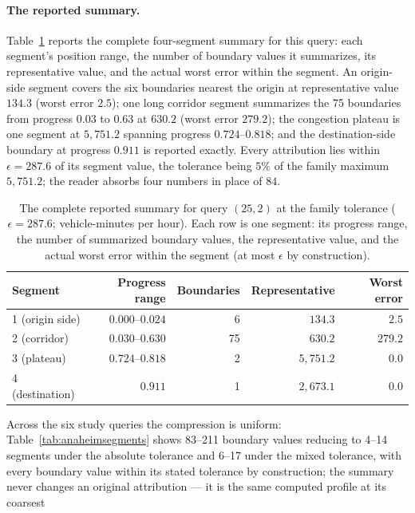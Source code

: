 \paragraph{The reported summary.}
Table~\ref{tab:anaheimsegmentsfull} reports the complete four-segment
summary for this query: each segment's position range, the number of
boundary values it summarizes, its representative value, and the actual
worst error within the segment. An origin-side segment covers the six
boundaries nearest the origin at representative value $134.3$ (worst
error $2.5$); one long corridor segment summarizes the 75 boundaries
from progress $0.03$ to $0.63$ at $630.2$ (worst error $279.2$); the
congestion plateau is one segment at $5{,}751.2$ spanning progress
$0.724$--$0.818$; and the destination-side boundary at progress
$0.911$ is reported exactly. Every attribution lies within
$\epsilon=287.6$ of its segment value, the tolerance being $5\%$ of
the family maximum $5{,}751.2$; the reader absorbs four numbers in
place of $84$.
\begin{table}[t]\centering\footnotesize
\caption{The complete reported summary for query $(25,2)$ at the
family tolerance ($\epsilon=287.6$; vehicle-minutes per hour). Each row
is one segment: its progress range, the number of summarized boundary
values, the representative value, and the actual worst error within the
segment (at most $\epsilon$ by construction).}\label{tab:anaheimsegmentsfull}
\setlength{\tabcolsep}{5pt}
\begin{tabular*}{\tblwidth}{@{\extracolsep{\fill}}lrrrr}
\toprule
Segment & Progress range & Boundaries & Representative & Worst error\\
\midrule
1 (origin side) & $0.000$--$0.024$ & 6 & $134.3$ & $2.5$\\
2 (corridor) & $0.030$--$0.630$ & 75 & $630.2$ & $279.2$\\
3 (plateau) & $0.724$--$0.818$ & 2 & $5{,}751.2$ & $0.0$\\
4 (destination) & $0.911$ & 1 & $2{,}673.1$ & $0.0$\\
\bottomrule\end{tabular*}\end{table}
Across the six study queries the compression is uniform:
Table~\ref{tab:anaheimsegments} shows 83--211 boundary values reducing
to 4--14 segments under the absolute tolerance and 6--17 under the
mixed tolerance, with every boundary value within its stated
tolerance by construction; the summary never changes an original
attribution --- it is the same computed profile at its coarsest
